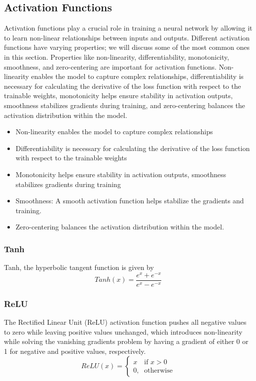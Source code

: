 \subsection{Activation Functions}
Activation functions play a crucial role in training a neural network by allowing it to learn non-linear relationships between inputs and outputs.
Different activation functions have varying properties; we will discuss some of the most common ones in this section.
Properties like non-linearity, differentiability, monotonicity, smoothness, and zero-centering are important for activation functions.
Non-linearity enables the model to capture complex relationships, differentiability is necessary for calculating the derivative of the loss function with respect to the trainable weights, monotonicity helps ensure stability in activation outputs, smoothness stabilizes gradients during training, and zero-centering balances the activation distribution within the model.

\begin{itemize}
    \item Non-linearity enables the model to capture complex relationships
    \item Differentiability is necessary for calculating the derivative of the loss function with respect to the trainable weights
    \item Monotonicity helps ensure stability in activation outputs, smoothness stabilizes gradients during training
    \item Smoothness: A smooth activation function helps stabilize the gradients and training.
    \item Zero-centering balances the activation distribution within the model.
\end{itemize}

\subsubsection{Tanh}
Tanh, the hyperbolic tangent function is given by
\begin{equation}\label{eq:tanh}
    Tanh(x) = \frac{e^x+e^{-x}}{e^x-e^{-x}}
\end{equation}

\subsubsection{ReLU}
The Rectified Linear Unit (ReLU) activation function pushes all negative values to zero while leaving positive values unchanged,
which introduces non-linearity while solving the vanishing gradients problem by having a gradient of either 0 or 1 for negative and positive values, respectively.
\begin{equation}\label{eq:relu}
    ReLU(x) = \begin{cases} x & \mbox{if } x > 0 \\ \mbox{0,} & \mbox{otherwise} \end{cases}
\end{equation}

